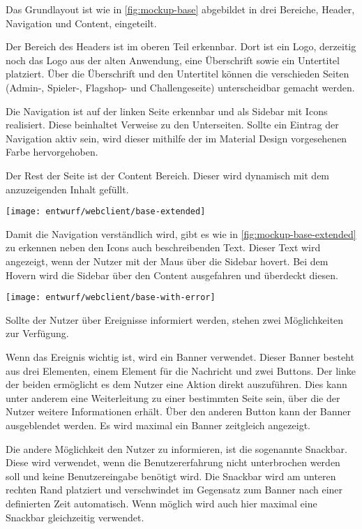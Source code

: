 Das Grundlayout ist wie in \autoref{fig:mockup-base} abgebildet in drei Bereiche, Header, Navigation und Content, eingeteilt. 

Der Bereich des Headers ist im oberen Teil erkennbar. Dort ist ein Logo, derzeitig noch das Logo aus der alten Anwendung, eine Überschrift sowie ein Untertitel platziert. Über die Überschrift und den Untertitel können die verschieden Seiten (Admin-, Spieler-, Flagshop- und Challengeseite) unterscheidbar gemacht werden.

Die Navigation ist auf der linken Seite erkennbar und als Sidebar mit Icons realisiert. Diese beinhaltet Verweise zu den Unterseiten. Sollte ein Eintrag der Navigation aktiv sein, wird dieser mithilfe der im Material Design vorgesehenen Farbe hervorgehoben.

Der Rest der Seite ist der Content Bereich. Dieser wird dynamisch mit dem anzuzeigenden Inhalt gefüllt.

\begin{center}
	\texttt{[image: entwurf/webclient/base-extended]}
	\label{fig:mockup-base-extended}
\end{center}

Damit die Navigation verständlich wird, gibt es wie in \autoref{fig:mockup-base-extended} zu erkennen neben den Icons auch beschreibenden Text. Dieser Text wird angezeigt, wenn der Nutzer mit der Maus über die Sidebar hovert. Bei dem Hovern wird die Sidebar über den Content ausgefahren und überdeckt diesen.

\begin{center}
	\texttt{[image: entwurf/webclient/base-with-error]}
	\label{fig:mockup-base-with-error}
\end{center}

Sollte der Nutzer über Ereignisse informiert werden, stehen zwei Möglichkeiten zur Verfügung.

Wenn das Ereignis wichtig ist, wird ein Banner verwendet. Dieser Banner besteht aus drei Elementen, einem Element für die Nachricht und zwei Buttons. Der linke der beiden ermöglicht es dem Nutzer eine Aktion direkt auszuführen. Dies kann unter anderem eine Weiterleitung zu einer bestimmten Seite sein, über die der Nutzer weitere Informationen erhält. Über den anderen Button kann der Banner ausgeblendet werden. Es wird maximal ein Banner zeitgleich angezeigt.

Die andere Möglichkeit den Nutzer zu informieren, ist die sogenannte Snackbar. Diese wird verwendet, wenn die Benutzererfahrung nicht unterbrochen werden soll und keine Benutzereingabe benötigt wird.
Die Snackbar wird am  unteren rechten Rand platziert und verschwindet im Gegensatz zum Banner nach einer definierten Zeit automatisch. Wenn möglich wird auch hier maximal eine Snackbar gleichzeitig verwendet.

